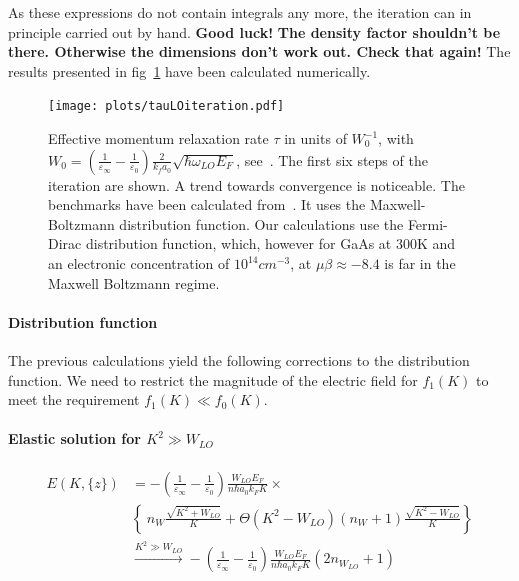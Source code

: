 \documentclass[physics,phd,nolot,nolof]{uccthesis}%
\newcommand{\alert}[1]{\textbf{\color{red}#1}}
\begin{document}
{As these expressions do not contain integrals any more, the iteration
can in principle carried out by hand. \alert{Good luck!}
\alert{The density factor shouldn't be there. Otherwise the dimensions don't work out. Check that again!}
The results presented in fig~\ref{fig:tauLOiteration} have been calculated
numerically.
\begin{figure}[tb]
  \begin{center}
    \texttt{[image: plots/tauLOiteration.pdf]}
  \end{center}
  \caption{Effective momentum relaxation rate $\tau$ in units of $W_0^{-1}$, 
  with $W_0=(\frac{1}{\varepsilon_\infty}-\frac{1}{\varepsilon_0})\frac{2}{k_fa_0}\sqrt{\hbar\omega_{LO} E_F}$,
  see~\cite{Ridleyladdermethod}.
  The first six steps of the iteration are shown. A trend towards convergence
  is noticeable.
  The benchmarks have been calculated from~\cite{Martinscode}.
  It uses the Maxwell-Boltzmann distribution function.
  Our calculations use the Fermi-Dirac distribution function, which, however
  for GaAs at 300K and an electronic concentration of $10^{14}cm^{-3}$, at
  $\mu\beta \approx -8.4$ is far in the Maxwell Boltzmann regime.
  }
  \label{fig:tauLOiteration}
\end{figure}
\paragraph*{Distribution function}%
The previous calculations yield the following corrections to the distribution function. 
We need to restrict the magnitude of the electric field for $f_1(K)$ to meet the requirement
$f_1(K)\ll f_0(K)$.

\paragraph*{Elastic solution for $K^2\gg W_{LO}$}
\begin{equation}
  \begin{split}
E(K,\{z\})
&=- 
\left(\frac{1}{\varepsilon_\infty}-\frac{1}{\varepsilon_0}\right)
\frac{W_{LO}E_F}{n\hbar a_0k_F K}
    \times\\
&  \left\{~
n_W
\frac{\sqrt{K^2+W_{LO}}}{K}
+\Theta(K^2-W_{LO})
\left(n_W+1\right)
\frac{\sqrt{K^2-W_{LO}}}{K}
\right\}\\
&\stackrel{K^2\gg W_{LO}}{\to}
-\left(\frac{1}{\varepsilon_\infty}-\frac{1}{\varepsilon_0}\right)
\frac{W_{LO}E_F}{n\hbar a_0k_F K}
(2 n_{W_{LO}} +1)
\end{split}
  \label{eq:EK-LO}
\end{equation}

}
\end{document}
